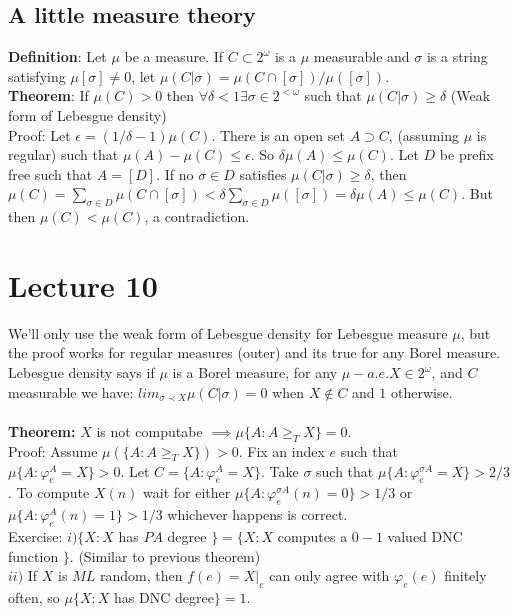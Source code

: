\documentclass{article}
\begin{document}
     \subsection{A little measure theory}
     \textbf{Definition}: Let $\mu$ be a measure. If $C \subset 2^\omega$ is a $\mu$ measurable and $\sigma$ is a string satisfying $\mu[\sigma] \neq 0$, let $\mu(C|\sigma) = \mu(C \cap [\sigma])/\mu([\sigma])$.\\
     \textbf{Theorem}: If $\mu(C)>0$ then $\forall \delta < 1 \exists \sigma \in 2^{<\omega}$ such that $\mu(C|\sigma)\geq \delta$ (Weak form of Lebesgue density)\\
     Proof: Let $\epsilon = (1/\delta -1)\mu(C)$. There is an open set $A \supset C$, (assuming $\mu$ is regular) such that $\mu(A) - \mu(C) \leq \epsilon$. So $\delta \mu(A) \leq \mu(C)$. Let $D$ be prefix free such that $A = [D]$. If no $\sigma \in D$ satisfies $\mu(C|\sigma) \geq \delta$, then $\mu(C) = \sum_{\sigma \in D} \mu(C \cap [\sigma]) < \delta \sum_{\sigma \in D} \mu([\sigma]) = \delta \mu(A) \leq \mu(C)$. But then $\mu(C) < \mu(C)$, a contradiction. \newpage
     \section{Lecture 10}
     We'll only use the weak form of Lebesgue density for Lebesgue measure $\mu$, but the proof works for regular measures (outer) and its true for any Borel measure.\\
     Lebesgue density says if $\mu$ is a Borel measure, for any $\mu-a.e. X\in 2^\omega$, and $C$ measurable we have: 
     $lim_{\sigma \prec X } \mu(C|\sigma) = 0 $ when $X\not \in C$ and $1$ otherwise.\\
     \\
     \textbf{Theorem:} $X$ is not computabe $\implies \mu\{A: A\geq_T X\} = 0$.
     \\ Proof: Assume $\mu(\{A: A\geq_T X\})>0$. Fix an index $e$ such that $\mu\{A: \varphi_e^A = X\} >0$. Let $C = \{A: \varphi_e^A = X\}$. Take $\sigma$ such that $\mu\{A: \varphi_e^{\sigma A} = X\} > 2/3$. To compute $X(n)$ wait for either $\mu\{A: \varphi_e^{\sigma A}(n)=0\} >1/3$ or $\mu\{A: \varphi_e^A(n) = 1\} > 1/3$ whichever happens is correct.\\
     Exercise: $i) \{X : X $ has $PA$ degree $\} = \{X: X$ computes a $0-1$ valued DNC function $\}$. (Similar to previous theorem)\\
     $ii)$ If $X$ is $ML$ random, then $f(e) = X|_e$ can only agree with $\varphi_e(e)$ finitely often, so $\mu\{X:X $ has DNC degree$\}=1$.
\end{document}
